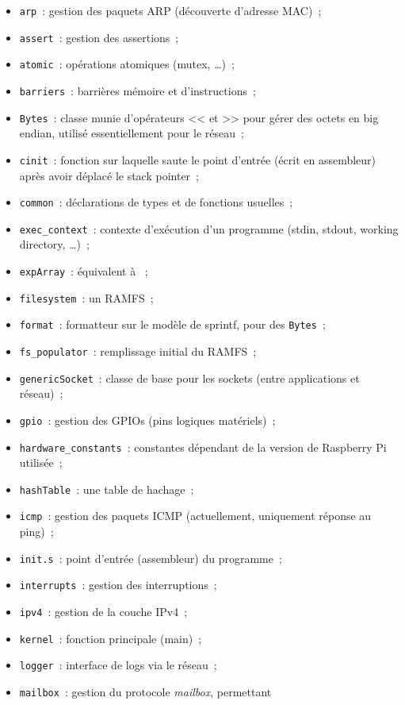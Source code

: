 \documentclass[11pt,a4paper]{article}
\newcommand{\fname}[1]{\texttt{#1}} %
\begin{document}
\begin{itemize}
	\item \fname{arp}~: gestion des paquets ARP (découverte d'adresse MAC)~;
	\item \fname{assert}~: gestion des assertions~;
	\item \fname{atomic}~: opérations atomiques (mutex, \ldots)~;
	\item \fname{barriers}~: barrières mémoire et d'instructions~;
	\item \fname{Bytes}~: classe munie d'opérateurs << et >> pour gérer des
		octets en big endian, utilisé essentiellement pour le réseau~;
	\item \fname{cinit}~: fonction sur laquelle saute le point d'entrée
		(écrit en assembleur) après avoir déplacé le stack pointer~;
	\item \fname{common}~: déclarations de types et de fonctions usuelles~;
	\item \fname{exec\_context}~: contexte d'exécution d'un programme
		(stdin, stdout, working directory, \ldots)~;
	\item \fname{expArray}~: équivalent à ~;
	\item \fname{filesystem}~: un RAMFS~;
	\item \fname{format}~: formatteur sur le modèle de sprintf, pour des
		\fname{Bytes}~;
	\item \fname{fs\_populator}~: remplissage initial du RAMFS~;
	\item \fname{genericSocket}~: classe de base pour les sockets (entre
		applications et réseau)~;
	\item \fname{gpio}~: gestion des GPIOs (pins logiques matériels)~;
	\item \fname{hardware\_constants}~: constantes dépendant de la version
		de Raspberry Pi utilisée~;
	\item \fname{hashTable}~: une table de hachage~;
	\item \fname{icmp}~: gestion des paquets ICMP (actuellement, uniquement
		réponse au ping)~;
	\item \fname{init.s}~: point d'entrée (assembleur) du programme~;
	\item \fname{interrupts}~: gestion des interruptions~;
	\item \fname{ipv4}~: gestion de la couche IPv4~;
	\item \fname{kernel}~: fonction principale (main)~;
	\item \fname{logger}~: interface de logs via le réseau~;
	\item \fname{mailbox}~: gestion du protocole \textit{mailbox}, permettant

\end{itemize}
\end{document}

